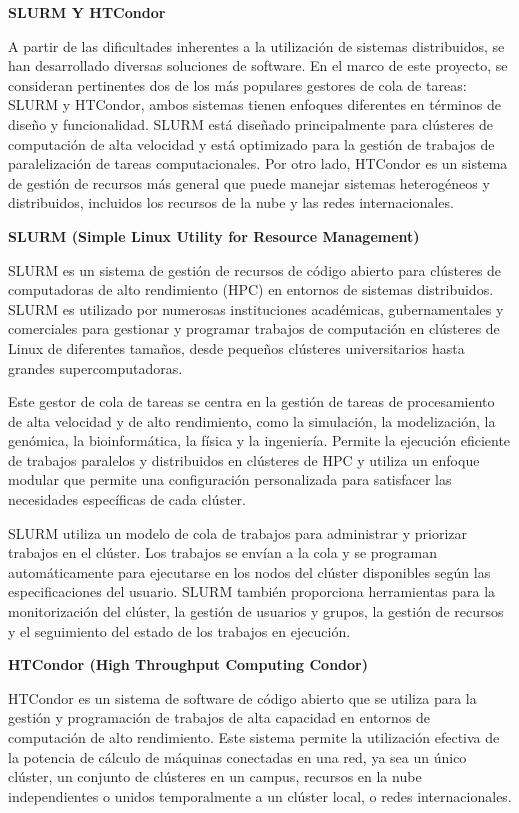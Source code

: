 \begin{spacing}{1.5}
  \textbf{SLURM Y HTCondor}

  A partir de las dificultades inherentes a la utilización de sistemas distribuidos, se han desarrollado diversas soluciones de software. En el marco de este proyecto, se consideran pertinentes dos de los más populares gestores de cola de tareas: SLURM y HTCondor, ambos sistemas tienen enfoques diferentes en términos de diseño y funcionalidad. SLURM está diseñado principalmente para clústeres de computación de alta velocidad y está optimizado para la gestión de trabajos de paralelización de tareas computacionales. Por otro lado, HTCondor es un sistema de gestión de recursos más general que puede manejar sistemas heterogéneos y distribuidos, incluidos los recursos de la nube y las redes internacionales.

  \textbf{SLURM (Simple Linux Utility for Resource Management)}

  SLURM es un sistema de gestión de recursos de código abierto para clústeres de computadoras de alto rendimiento (HPC) en entornos de sistemas distribuidos. SLURM es utilizado por numerosas instituciones académicas, gubernamentales y comerciales para gestionar y programar trabajos de computación en clústeres de Linux de diferentes tamaños, desde pequeños clústeres universitarios hasta grandes supercomputadoras.

  Este gestor de cola de tareas se centra en la gestión de tareas de procesamiento de alta velocidad y de alto rendimiento, como la simulación, la modelización, la genómica, la bioinformática, la física y la ingeniería. Permite la ejecución eficiente de trabajos paralelos y distribuidos en clústeres de HPC y utiliza un enfoque modular que permite una configuración personalizada para satisfacer las necesidades específicas de cada clúster.

  SLURM utiliza un modelo de cola de trabajos para administrar y priorizar trabajos en el clúster. Los trabajos se envían a la cola y se programan automáticamente para ejecutarse en los nodos del clúster disponibles según las especificaciones del usuario. SLURM también proporciona herramientas para la monitorización del clúster, la gestión de usuarios y grupos, la gestión de recursos y el seguimiento del estado de los trabajos en ejecución.
  \vspace{3mm}

  \textbf{HTCondor (High Throughput Computing Condor)}
  
  HTCondor es un sistema de software de código abierto que se utiliza para la gestión y programación de trabajos de alta capacidad en entornos de computación de alto rendimiento. Este sistema permite la utilización efectiva de la potencia de cálculo de máquinas conectadas en una red, ya sea un único clúster, un conjunto de clústeres en un campus, recursos en la nube independientes o unidos temporalmente a un clúster local, o redes internacionales.


\end{spacing}
